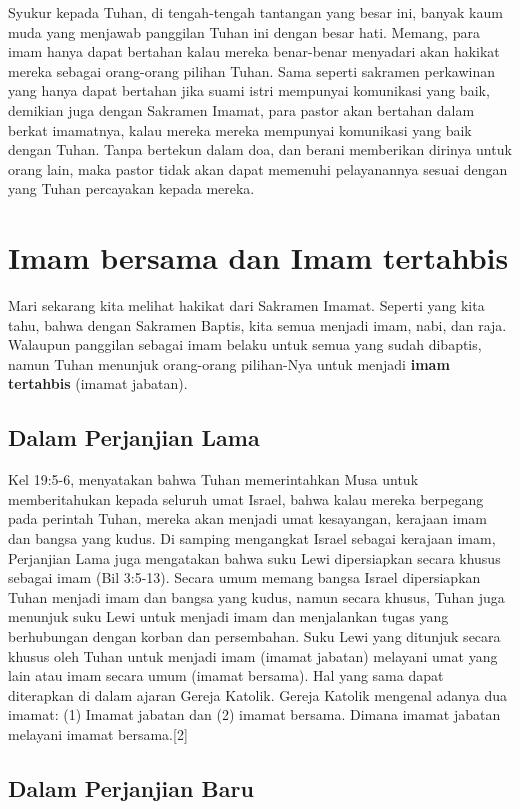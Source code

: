 Syukur kepada Tuhan, di tengah-tengah tantangan yang besar ini, banyak kaum muda yang menjawab panggilan Tuhan ini dengan besar hati. Memang, para imam hanya dapat bertahan kalau mereka benar-benar menyadari akan hakikat mereka sebagai orang-orang pilihan Tuhan. Sama seperti sakramen perkawinan yang hanya dapat bertahan jika suami istri mempunyai komunikasi yang baik, demikian juga dengan Sakramen Imamat, para pastor akan bertahan dalam berkat imamatnya, kalau mereka mereka mempunyai komunikasi yang baik dengan Tuhan. Tanpa bertekun dalam doa, dan berani memberikan dirinya untuk orang lain, maka pastor tidak akan dapat memenuhi pelayanannya sesuai dengan yang Tuhan percayakan kepada mereka.

\section*{Imam bersama dan Imam tertahbis}

Mari sekarang kita melihat hakikat dari Sakramen Imamat. Seperti yang kita tahu, bahwa dengan Sakramen Baptis, kita semua menjadi imam, nabi, dan raja. Walaupun panggilan sebagai imam belaku untuk semua yang sudah dibaptis, namun Tuhan menunjuk orang-orang pilihan-Nya untuk menjadi \textbf{imam tertahbis} (imamat jabatan).

\subsection*{Dalam Perjanjian Lama}

Kel 19:5-6, menyatakan bahwa Tuhan memerintahkan Musa untuk memberitahukan kepada seluruh umat Israel, bahwa kalau mereka berpegang pada perintah Tuhan, mereka akan menjadi umat kesayangan, kerajaan imam dan bangsa yang kudus. Di samping mengangkat Israel sebagai kerajaan imam, Perjanjian Lama juga mengatakan bahwa suku Lewi dipersiapkan secara khusus sebagai imam (Bil 3:5-13). Secara umum memang bangsa Israel dipersiapkan Tuhan menjadi imam dan bangsa yang kudus, namun secara khusus, Tuhan juga menunjuk suku Lewi untuk menjadi imam dan menjalankan tugas yang berhubungan dengan korban dan persembahan. Suku Lewi yang ditunjuk secara khusus oleh Tuhan untuk menjadi imam (imamat jabatan) melayani umat yang lain atau imam secara umum (imamat bersama). Hal yang sama dapat diterapkan di dalam ajaran Gereja Katolik. Gereja Katolik mengenal adanya dua imamat: (1) Imamat jabatan dan (2) imamat bersama. Dimana imamat jabatan melayani imamat bersama.[2]

\subsection*{Dalam Perjanjian Baru}

